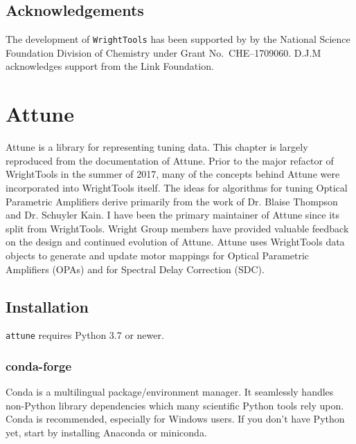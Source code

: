 \hypertarget{acknowledgements}{%
\section{Acknowledgements}\label{acknowledgements}}

The development of \texttt{WrightTools} has been supported by by the
National Science Foundation Division of Chemistry under Grant
No.~CHE--1709060. D.J.M acknowledges support from the Link Foundation.

\clearpage

\chapter{Attune}  %

\clearpage

Attune is a library for representing tuning data.
This chapter is largely reproduced from the documentation of Attune.
Prior to the major refactor of WrightTools in the summer of 2017, many of the concepts behind Attune were incorporated into WrightTools itself.
The ideas for algorithms for tuning Optical Parametric Amplifiers derive primarily from the work of Dr. Blaise Thompson and Dr. Schuyler Kain.
I have been the primary maintainer of Attune since its split from WrightTools.
Wright Group members have provided valuable feedback on the design and continued evolution of Attune.
Attune uses WrightTools data objects to generate and update motor mappings for Optical Parametric Amplifiers (OPAs) and for Spectral Delay Correction (SDC).

\section{Installation}\label{install}

\texttt{attune} requires Python 3.7 or newer.

\hypertarget{conda-forge}{%
\subsection{conda-forge}\label{conda-forge}}

Conda\cite{conda} is a multilingual
package/environment manager. It seamlessly handles non-Python library
dependencies which many scientific Python tools rely upon. Conda is
recommended, especially for Windows users. If you don't have Python yet,
start by installing Anaconda\cite{anaconda}
or miniconda\cite{miniconda}.

